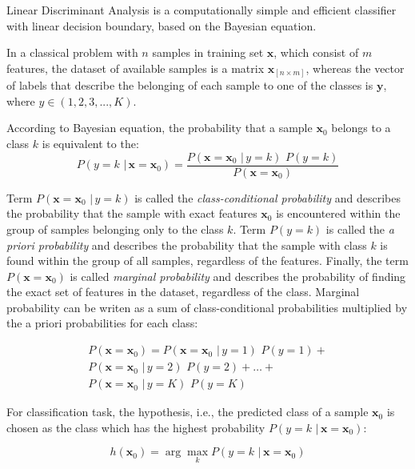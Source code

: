 \documentclass{article}
\newcommand{\argmax}{\arg\!\max} %
\begin{document}
Linear Discriminant Analysis is a computationally simple and efficient classifier with linear decision boundary, based on the Bayesian equation.

In a classical problem with $n$ samples in training set $\mathbf{x}$, which consist of $m$ features, the dataset of available samples is a matrix $\mathbf{x}_{[n \times m]}$, whereas the vector of labels that describe the belonging of each sample to one of the classes is $\mathbf{y}$, where $y \in (1,2,3,...,K)$.

According to Bayesian equation, the probability that a sample $\mathbf{x}_0$ belongs to a class $k$ is equivalent to the: 
\begin{equation} 
P(y=k \,\, | \, \mathbf{x}=\mathbf{x}_0) = \frac{P(\mathbf{x}=\mathbf{x}_0  \,\, | \, y=k) \,\,P(y=k)} {P(\mathbf{x}=\mathbf{x}_0)}
\end{equation}

Term $P(\mathbf{x}=\mathbf{x}_0  \,\, | \, y=k)$ is called the \emph{class-conditional probability} and describes the probability that the sample with exact features $\mathbf{x}_0$ is encountered within the group of samples belonging only to the class $k$. Term $P(y=k)$ is called the \emph{a priori probability} and describes the probability that the sample with class $k$ is found within the group of all samples, regardless of the features. Finally, the term $P(\mathbf{x}=\mathbf{x}_0)$ is called \emph{marginal probability} and describes the probability of finding the exact set of features in the dataset, regardless of the class. Marginal probability can be writen as a sum of class-conditional probabilities multiplied by the a priori probabilities for each class:

\begin{equation}
\begin{split}
P(\mathbf{x}=\mathbf{x}_0) = P(\mathbf{x}=\mathbf{x}_0  \,\, | \, y=1) \,\,P(y=1) + \\
P(\mathbf{x}=\mathbf{x}_0  \,\, | \, y=2) \,\,P(y=2) + \dots + \\
P(\mathbf{x}=\mathbf{x}_0  \,\, | \, y=K) \,\,P(y=K)
\end{split}
\end{equation}

For classification task, the hypothesis, i.e., the predicted class of a sample $\mathbf{x}_0$ is chosen as the class which has the highest probability $P(y=k \,\, | \, \mathbf{x}=\mathbf{x}_0)$:

\begin{equation} 
h(\mathbf{x}_0) = \argmax_k P(y=k \,\, | \, \mathbf{x}=\mathbf{x}_0)
\end{equation}
\end{document}
